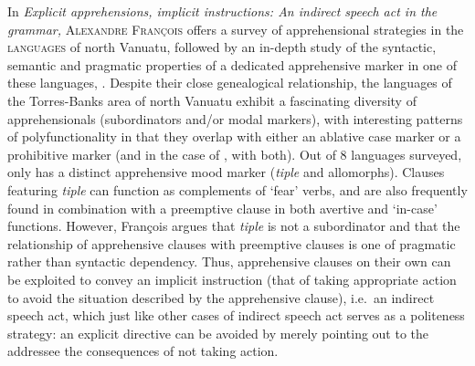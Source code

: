 \documentclass[output=paper,colorlinks,citecolor=brown]{langscibook}
\begin{document}
In \textit{Explicit apprehensions, implicit instructions: An indirect speech act in the grammar,} \textsc{Alexandre} \textsc{François} offers a survey of apprehensional strategies in the \textsc{} \textsc{languages} of north Vanuatu, followed by an in-depth study of the syntactic, semantic and pragmatic properties of a dedicated apprehensive marker in one of these languages, \textsc{}. Despite their close genealogical relationship, the languages of the Torres-Banks area of north Vanuatu exhibit a fascinating diversity of apprehensionals (subordinators and/or modal markers), with interesting patterns of polyfunctionality in that they overlap with either an ablative case marker or a prohibitive marker (and in the case of , with both). Out of 8 languages surveyed, only  has a distinct apprehensive mood marker (\textit{tiple} and allomorphs). Clauses featuring \textit{tiple} can function as complements of `fear' verbs, and are also frequently found in combination with a preemptive clause in both avertive and `in-case' functions. However, François argues that \textit{tiple} is not a subordinator and that the relationship of apprehensive clauses with preemptive clauses is one of pragmatic rather than syntactic dependency. Thus, apprehensive clauses on their own can be exploited to convey an implicit instruction (that of taking appropriate action to avoid the situation described by the apprehensive clause), i.e.\ an indirect speech act, which just like other cases of indirect speech act serves as a politeness strategy: an explicit directive can be avoided by merely pointing out to the addressee the consequences of not taking action.
\end{document}
